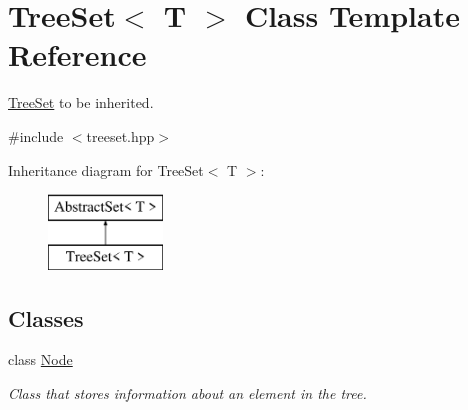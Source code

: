 \hypertarget{class_tree_set}{\section{Tree\-Set$<$ T $>$ Class Template Reference}
\label{class_tree_set}
}


\hyperlink{class_tree_set}{Tree\-Set} to be inherited.  




{\ttfamily \#include $<$treeset.\-hpp$>$}

Inheritance diagram for Tree\-Set$<$ T $>$\-:\begin{figure}[H]
\begin{center}
\leavevmode
\includegraphics[height=2.000000cm]{class_tree_set}
\end{center}
\end{figure}
\subsection*{Classes}
\begin{DoxyCompactItemize}
\item 
class \hyperlink{class_tree_set_1_1_node}{Node}
\begin{DoxyCompactList}\small\item\em Class that stores information about an element in the tree. \end{DoxyCompactList}\end{DoxyCompactItemize}
